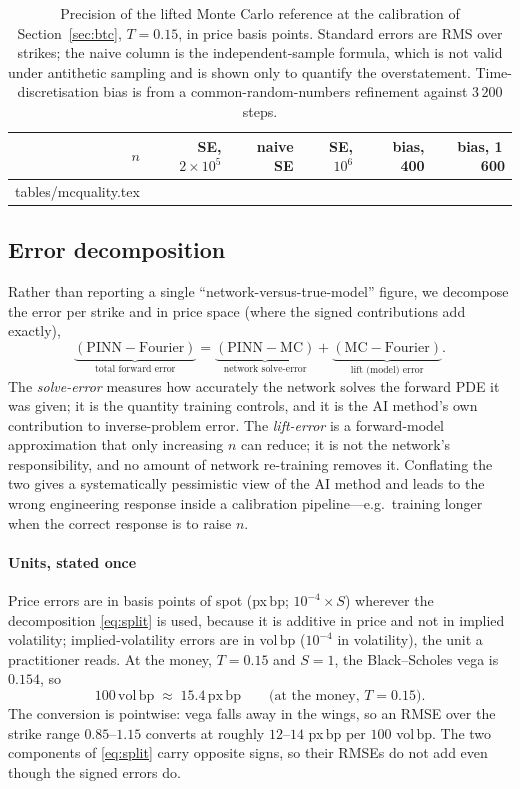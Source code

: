 \documentclass[preprint,12pt]{elsarticle}
\makeatletter
\newcommand{\bp}{\ensuremath{\,\mathrm{bp}}}
\newif\ifrevtable
\newcommand{\revrows}[1]{\@@input tables/#1.tex }
\makeatother
\begin{document}
\IfFileExists{tables/mcquality.tex}{\revtabletrue}{\revtablefalse}\ifrevtable
\begin{table}[!htbp]
\centering
\caption{Precision of the lifted Monte Carlo reference at the calibration of
Section~\ref{sec:btc}, $T{=}0.15$, in price basis points. Standard errors are
RMS over strikes; the naive column is the independent-sample formula, which is
not valid under antithetic sampling and is shown only to quantify the
overstatement. Time-discretisation bias is from a common-random-numbers
refinement against $3\,200$ steps.}
\label{tab:mcq}
\small
\begin{tabular}{@{}r r r r r r@{}}
\toprule
$n$ & SE, $2{\times}10^5$ & naive SE & SE, $10^6$ & bias, 400 & bias, 1\,600 \\
\midrule
\revrows{mcquality}
\bottomrule
\end{tabular}
\end{table}
\fi

\subsection{Error decomposition}
\label{sec:decomp}
Rather than reporting a single ``network-versus-true-model'' figure, we decompose
the error per strike and in price space (where the signed contributions add
exactly),
\begin{equation}
  \underbrace{(\mathrm{PINN}-\mathrm{Fourier})}_{\text{total forward error}}
  =\underbrace{(\mathrm{PINN}-\mathrm{MC})}_{\text{network solve-error}}
  +\underbrace{(\mathrm{MC}-\mathrm{Fourier})}_{\text{lift (model) error}}.
  \label{eq:split}
\end{equation}
The \emph{solve-error} measures how accurately the network solves the forward
PDE it was given; it is the quantity training controls, and it is the AI method's
own contribution to inverse-problem error. The \emph{lift-error} is a
forward-model approximation that only increasing $n$ can reduce; it is not the
network's responsibility, and no amount of network re-training removes it.
Conflating the two gives a systematically pessimistic view of the AI method and
leads to the wrong engineering response inside a calibration pipeline---e.g.\ training longer when the correct response is to raise $n$.

\paragraph{Units, stated once} Price errors are in basis points of spot
(px\bp; $10^{-4}\times S$) wherever the decomposition \eqref{eq:split} is used,
because it is additive in price and not in implied volatility; implied-volatility
errors are in vol\bp{} ($10^{-4}$ in volatility), the unit a practitioner reads.
At the money, $T{=}0.15$ and $S{=}1$, the Black--Scholes vega is $0.154$, so
\[
  100\,\mathrm{vol\bp} \;\approx\; 15.4\,\mathrm{px\bp}
  \qquad\text{(at the money, }T{=}0.15\text{)}.
\]
The conversion is pointwise: vega falls away in the wings, so an RMSE over the
strike range $0.85$--$1.15$ converts at roughly $12$--$14$ px\bp{} per $100$
vol\bp. The two components of \eqref{eq:split} carry opposite signs, so their
RMSEs do not add even though the signed errors do.
\end{document}
